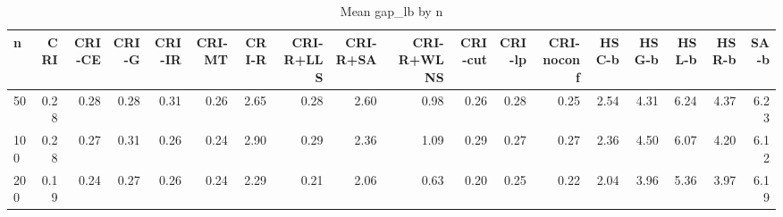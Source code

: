 \begin{table}[htbp]
\centering
\small
\caption{Mean gap\_lb by n}
\label{tab:E5_ablation_b10_by_n}
\begin{tabular}{lrrrrrrrrrrrrrrrrr}
\toprule
n & CRI & CRI-CE & CRI-G & CRI-IR & CRI-MT & CRI-R & CRI-R+LLS & CRI-R+SA & CRI-R+WLNS & CRI-cut & CRI-lp & CRI-noconf & HSC-b & HSG-b & HSL-b & HSR-b & SA-b \\
\midrule
50 & 0.28 & 0.28 & 0.28 & 0.31 & 0.26 & 2.65 & 0.28 & 2.60 & 0.98 & 0.26 & 0.28 & 0.25 & 2.54 & 4.31 & 6.24 & 4.37 & 6.23 \\
100 & 0.28 & 0.27 & 0.31 & 0.26 & 0.24 & 2.90 & 0.29 & 2.36 & 1.09 & 0.29 & 0.27 & 0.27 & 2.36 & 4.50 & 6.07 & 4.20 & 6.12 \\
200 & 0.19 & 0.24 & 0.27 & 0.26 & 0.24 & 2.29 & 0.21 & 2.06 & 0.63 & 0.20 & 0.25 & 0.22 & 2.04 & 3.96 & 5.36 & 3.97 & 6.19 \\
\bottomrule
\end{tabular}
\end{table}

